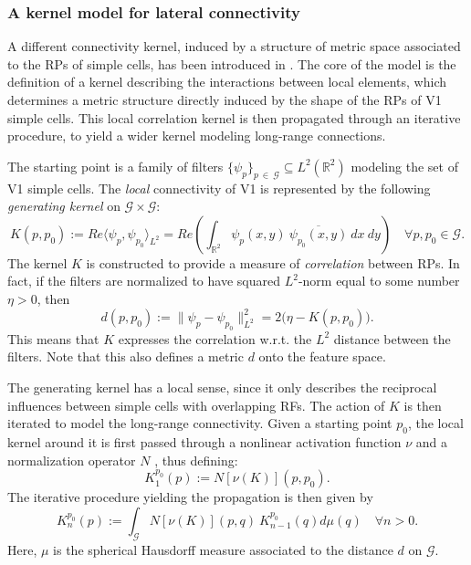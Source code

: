 \documentclass[11pt,oneside,reqno]{amsart}
\begin{document}
 \subsubsection{A kernel model for lateral connectivity}\label{neuroker}
 
 A different connectivity kernel, induced by a structure of metric space associated to the RPs of simple cells, has been introduced in \citet{neuro}. The core of the model is the definition of a kernel describing the interactions between local elements, which determines a metric structure directly induced by the shape of the RPs of V1 simple cells. This local correlation kernel is then propagated through an iterative procedure, to yield a wider kernel modeling long-range connections.
 
 The starting point is a family of filters $\{\psi_p\}_{p\:\in\:\mathcal{G}} \subseteq L^2(\mathbb{R}^2)$ modeling the set of V1 simple cells. The \emph{local} connectivity of V1 is represented by the following \emph{generating kernel} on $\mathcal{G} \times \mathcal{G}$: 
 \begin{equation}\label{defK}
 K(p,p_0) := Re\langle\psi_p,\psi_{p_0}\rangle_{L^2} = Re \left(\int_{\mathbb{R}^2} \psi_p(x,y) \: \overline{\psi_{p_0}(x,y)} \: dx \: dy \right) \quad \forall p,p_0 \in \mathcal{G}.
 \end{equation}
 The kernel $K$ is constructed to provide a measure of \emph{correlation} between RPs. In fact, if the filters are normalized to have squared $L^2$-norm equal to some number $\eta>0$, then 
 \[d(p,p_0) := \| \psi_p - \psi_{p_0} \|^2_{L^2} = 2\big(\eta - K(p,p_0)\big).\]
 This means that $K$ expresses the correlation w.r.t. the $L^2$ distance between the filters. Note that this also defines a metric $d$ onto the feature space.
 
 The generating kernel has a local sense, since it only describes the reciprocal influences between simple cells with overlapping RFs. The action of $K$ is then iterated to model the long-range connectivity. Given a starting point $p_0$, the local kernel around it is first passed through a nonlinear activation function $\nu$ and a normalization operator
$N$ \citep[see also][]{coiflaf}, thus defining:
 \begin{equation}\label{laf}K_1^{p_0}(p) := N[\nu(K)](p,p_0).\end{equation}
 The iterative procedure yielding the propagation is then given by
 \begin{equation}\label{iteration} K_{n}^{p_0}(p) := \int_\mathcal{G} N[\nu(K)](p,q) \: K_{n-1}^{p_0}(q) d\mu(q) 
 \quad \forall n>0.\end{equation}
 Here, $\mu$ is the spherical Hausdorff measure \citep{hausd} associated to the distance $d$ on $\mathcal{G}$.
 
\end{document}
